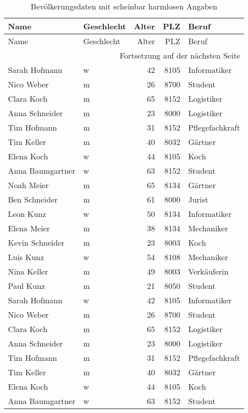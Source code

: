 \begin{lpu}
\begin{longtable}{llrrl}
\caption{Bevölkerungsdaten mit scheinbar harmlosen Angaben}
\label{tab:bevoelkerung} \\
\toprule
Name & Geschlecht & Alter & PLZ & Beruf \\
\midrule
\endfirsthead
\toprule
Name & Geschlecht & Alter & PLZ & Beruf \\
\midrule
\endhead
\midrule
\multicolumn{5}{r}{{Fortsetzung auf der nächsten Seite}} \\
\midrule
\endfoot
\bottomrule
\endlastfoot
Sarah Hofmann     & w & 42 & 8105 & Informatiker \\
Nico Weber        & m & 26 & 8700 & Student \\
Clara Koch        & m & 65 & 8152 & Logistiker \\
Anna Schneider    & m & 23 & 8000 & Logistiker \\
Tim Hofmann       & m & 31 & 8152 & Pflegefachkraft \\
Tim Keller        & m & 40 & 8032 & Gärtner \\
Elena Koch        & w & 44 & 8105 & Koch \\
Anna Baumgartner  & w & 63 & 8152 & Student \\
Noah Meier        & m & 65 & 8134 & Gärtner \\
Ben Schneider     & m & 61 & 8000 & Jurist \\
Leon Kunz         & w & 50 & 8134 & Informatiker \\
Elena Meier       & m & 38 & 8134 & Mechaniker \\
Kevin Schneider   & m & 23 & 8003 & Koch \\
Luis Kunz         & w & 54 & 8108 & Mechaniker \\
Nina Keller       & m & 49 & 8003 & Verkäuferin \\
Paul Kunz         & m & 21 & 8050 & Student \\
Sarah Hofmann & w & 42 & 8105 & Informatiker \\
Nico Weber & m & 26 & 8700 & Student \\
Clara Koch & m & 65 & 8152 & Logistiker \\
Anna Schneider & m & 23 & 8000 & Logistiker \\
Tim Hofmann & m & 31 & 8152 & Pflegefachkraft \\
Tim Keller & m & 40 & 8032 & Gärtner \\
Elena Koch & w & 44 & 8105 & Koch \\
Anna Baumgartner & w & 63 & 8152 & Student \\

\end{longtable}
\end{lpu}

